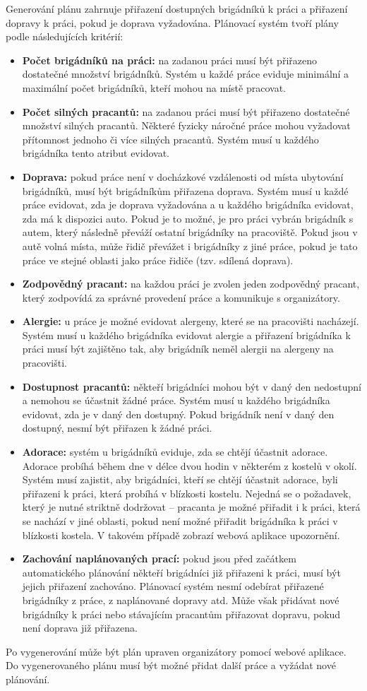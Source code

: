 Generování plánu zahrnuje přiřazení dostupných brigádníků k práci a přiřazení dopravy k práci, pokud je doprava vyžadována.
Plánovací systém tvoří plány podle následujících kritérií:
\begin{itemize}
    \item \textbf{Počet brigádníků na práci:} na zadanou práci musí být přiřazeno dostatečné množství brigádníků. Systém u každé práce eviduje minimální a maximální počet brigádníků, kteří mohou na místě pracovat. 
    \item \textbf{Počet silných pracantů:} na zadanou práci musí být přiřazeno dostatečné množství silných pracantů. Některé fyzicky náročné práce mohou vyžadovat přítomnost jednoho či více silných pracantů. Systém musí u každého brigádníka tento atribut evidovat.
    \item \textbf{Doprava:} pokud práce není v docházkové vzdálenosti od místa ubytování brigádníků, musí být brigádníkům přiřazena doprava. Systém musí u každé práce evidovat, zda je doprava vyžadována a u každého brigádníka evidovat, zda má k dispozici auto. Pokud je to možné, je pro práci vybrán brigádník s autem, který následně převáží ostatní brigádníky na pracoviště. Pokud jsou v autě volná místa, může řidič převážet i brigádníky z jiné práce, pokud je tato práce ve stejné oblasti jako práce řidiče (tzv. sdílená doprava).
    \item \textbf{Zodpovědný pracant:} na každou práci je zvolen jeden zodpovědný pracant, který zodpovídá za správné provedení práce a komunikuje s organizátory.
    \item \textbf{Alergie:} u práce je možné evidovat alergeny, které se na pracovišti nacházejí. Systém musí u každého brigádníka evidovat alergie a přiřazení brigádníka k práci musí být zajištěno tak, aby brigádník neměl alergii na alergeny na pracovišti.
    \item \textbf{Dostupnost pracantů:} někteří brigádníci mohou být v daný den nedostupní a nemohou se účastnit žádné práce. Systém musí u každého brigádníka evidovat, zda je v daný den dostupný. Pokud brigádník není v daný den dostupný, nesmí být přiřazen k žádné práci.
    \item \textbf{Adorace:} systém u brigádníků eviduje, zda se chtějí účastnit adorace. Adorace probíhá během dne v délce dvou hodin v některém z kostelů v okolí. Systém musí zajistit, aby brigádníci, kteří se chtějí účastnit adorace, byli přiřazeni k práci, která probíhá v blízkosti kostelu. Nejedná se o požadavek, který je nutné striktně dodržovat -- pracanta je možné přiřadit i k práci, která se nachází v jiné oblasti, pokud není možné přiřadit brigádníka k práci v blízkosti kostela. V takovém případě zobrazí webová aplikace upozornění.
    \item \textbf{Zachování naplánovaných prací:} pokud jsou před začátkem automatického plánování někteří brigádníci již přiřazeni k práci, musí být jejich přiřazení zachováno. Plánovací systém nesmí odebírat přiřazené brigádníky z práce, z naplánované dopravy atd. Může však přidávat nové brigádníky k práci nebo stávajícím pracantům přiřazovat dopravu, pokud není doprava již přiřazena.
\end{itemize}

Po vygenerování může být plán upraven organizátory pomocí webové aplikace. Do vygenerovaného plánu musí být možné přidat další práce a vyžádat nové plánování.